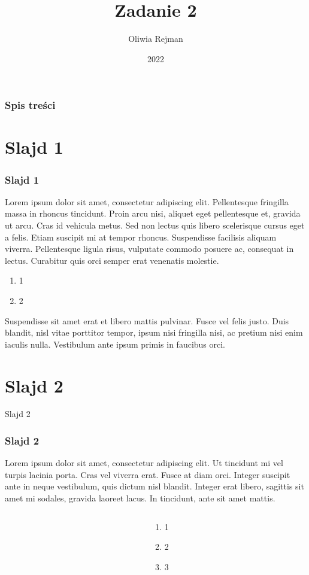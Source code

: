 \documentclass{beamer}
\title{Zadanie 2}
\author{Oliwia Rejman}
\institute{Uniwersytet Gdański}
\date{2022}
\begin{document}
	
	\frame{\titlepage}
	\begin{frame}
		\frametitle{Spis treści}
		\tableofcontents
	\end{frame}

\section{Slajd 1}
	\begin{frame}
		\frametitle{Slajd 1}
		Lorem ipsum dolor sit amet, consectetur adipiscing elit. Pellentesque fringilla massa in rhoncus tincidunt. Proin arcu nisi, aliquet eget pellentesque et, gravida ut arcu. Cras id vehicula metus. Sed non lectus quis libero scelerisque cursus eget a felis. Etiam suscipit mi at tempor rhoncus. Suspendisse facilisis aliquam viverra. Pellentesque ligula risus, vulputate commodo posuere ac, consequat in lectus. Curabitur quis orci semper erat venenatis molestie.
  		\begin{enumerate}
			\item 1
			\item 2
		\end{enumerate}
        Suspendisse sit amet erat et libero mattis pulvinar. Fusce vel felis justo. Duis blandit, nisl vitae porttitor tempor, ipsum nisi fringilla nisi, ac pretium nisi enim iaculis nulla. Vestibulum ante ipsum primis in faucibus orci.

	\end{frame}

\section{Slajd 2}
	\begin{frame}{Slajd 2}
 		\frametitle{Slajd 2}
   Lorem ipsum dolor sit amet, consectetur adipiscing elit. Ut tincidunt mi vel turpis lacinia porta. Cras vel viverra erat. Fusce at diam orci. Integer suscipit ante in neque vestibulum, quis dictum nisl blandit. Integer erat libero, sagittis sit amet mi sodales, gravida laoreet lacus. In tincidunt, ante sit amet mattis.
			\begin{columns}[t]
				\begin{column}{.8\textwidth}
					\\\adjincludegraphics[width=.8\linewidth, valign=t]{xd2.jpg}
					\newline
					\label{fig: Anime2}
				\end{column}
				\begin{column}{.2\textwidth}
					\begin{enumerate}
						\item 1
						\item 2
						\item 3
					\end{enumerate}
				\end{column}
			\end{columns}

	\end{frame}
\end{document}
